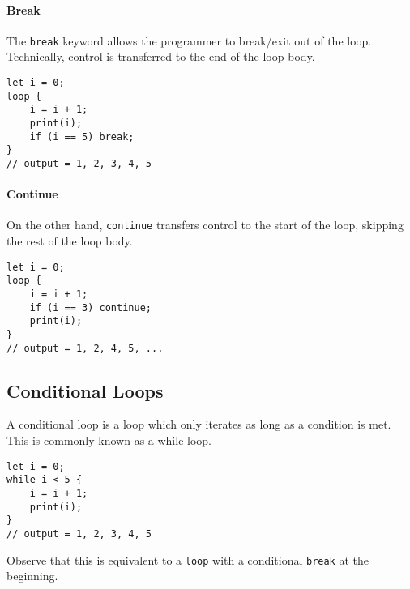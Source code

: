 \paragraph*{Break}

The \texttt{break} keyword allows the programmer to break/exit out of the loop.
Technically, control is transferred to the end of the loop body.

\begin{lstlisting}[language=CustomLang]
let i = 0;
loop {
    i = i + 1;
    print(i);
    if (i == 5) break;
}
// output = 1, 2, 3, 4, 5
\end{lstlisting}

\paragraph*{Continue}

On the other hand, \texttt{continue} transfers control to the start of the loop, skipping the rest of the loop body.

\begin{lstlisting}[language=CustomLang]
let i = 0;
loop {
    i = i + 1;
    if (i == 3) continue;
    print(i);
}
// output = 1, 2, 4, 5, ...
\end{lstlisting}

\subsection{Conditional Loops}

A conditional loop is a loop which only iterates as long as a condition is met.
This is commonly known as a while loop.

\begin{lstlisting}[language=CustomLang]
let i = 0;
while i < 5 {
    i = i + 1;
    print(i);
}
// output = 1, 2, 3, 4, 5
\end{lstlisting}

Observe that this is equivalent to a \texttt{loop} with a conditional \texttt{break} at the beginning.

